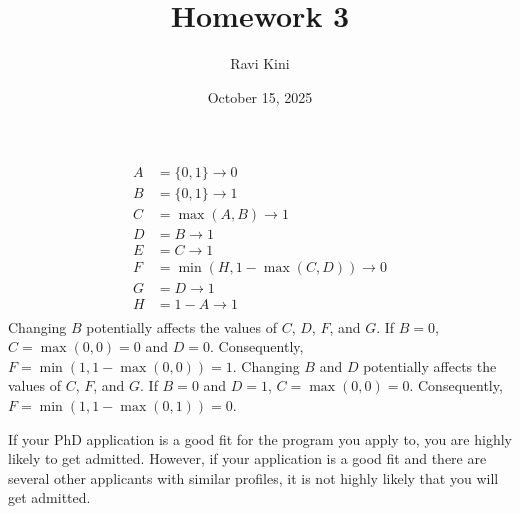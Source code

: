 \documentclass{article}
\title{Homework 3}
\author{Ravi Kini}
\date{October 15, 2025}
\begin{document}
\maketitle

\problem{}
\begin{center}
\end{center}
\begin{align*}
    A & = \{0, 1\} \to 0 \\
    B & = \{0, 1\} \to 1 \\
    C & = \max(A, B) \to 1 \ \\
    D & = B \to 1 \\
    E & = C \to 1 \\
    F & = \min(H, 1 - \max(C, D)) \to 0 \\
    G & = D \to 1 \\
    H & = 1 - A \to 1 \\
\end{align*}
Changing $B$ potentially affects the values of $C$, $D$, $F$, and $G$. If $B = 0$, $C = \max(0, 0) = 0$ and $D = 0$. Consequently, $F = \min(1, 1 - \max(0, 0)) = 1$.
Changing $B$ and $D$ potentially affects the values of $C$, $F$, and $G$. If $B = 0$ and $D = 1$, $C = \max(0, 0) = 0$. Consequently, $F = \min(1, 1 - \max(0, 1)) = 0$.
\clearpage

\problem{}
If your PhD application is a good fit for the program you apply to, you are highly likely to get admitted. However, if your application is a good fit and there are several other applicants with similar profiles, it is not highly likely that you will get admitted.
\end{document}
